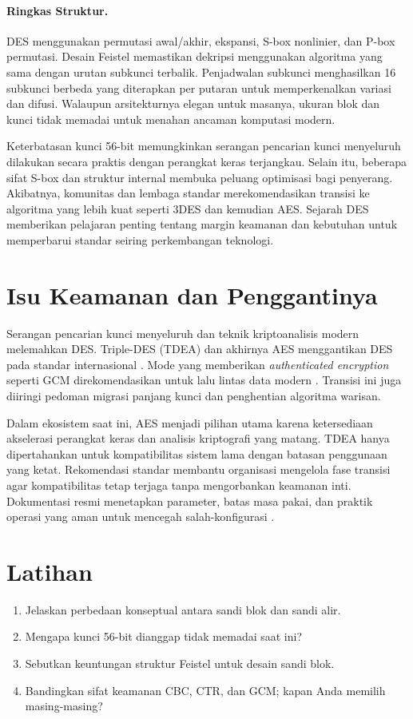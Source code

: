 \documentclass[../main.tex]{subfiles}
\begin{document}
\paragraph{Ringkas Struktur.} DES menggunakan permutasi awal/akhir, ekspansi, S-box nonlinier, dan P-box permutasi. Desain Feistel memastikan dekripsi menggunakan algoritma yang sama dengan urutan subkunci terbalik. Penjadwalan subkunci menghasilkan 16 subkunci berbeda yang diterapkan per putaran untuk memperkenalkan variasi dan difusi. Walaupun arsitekturnya elegan untuk masanya, ukuran blok dan kunci tidak memadai untuk menahan ancaman komputasi modern.

Keterbatasan kunci 56-bit memungkinkan serangan pencarian kunci menyeluruh dilakukan secara praktis dengan perangkat keras terjangkau. Selain itu, beberapa sifat S-box dan struktur internal membuka peluang optimisasi bagi penyerang. Akibatnya, komunitas dan lembaga standar merekomendasikan transisi ke algoritma yang lebih kuat seperti 3DES dan kemudian AES. Sejarah DES memberikan pelajaran penting tentang margin keamanan dan kebutuhan untuk memperbarui standar seiring perkembangan teknologi.

\section{Isu Keamanan dan Penggantinya}
Serangan pencarian kunci menyeluruh dan teknik kriptoanalisis modern melemahkan DES. Triple-DES (TDEA) dan akhirnya AES menggantikan DES pada standar internasional \citep{nist_des,nist_sp_800_67r2,nist_aes}. Mode yang memberikan \emph{authenticated encryption} seperti GCM direkomendasikan untuk lalu lintas data modern \citep{nist_sp_800_38d}. Transisi ini juga diiringi pedoman migrasi panjang kunci dan penghentian algoritma warisan.

Dalam ekosistem saat ini, AES menjadi pilihan utama karena ketersediaan akselerasi perangkat keras dan analisis kriptografi yang matang. TDEA hanya dipertahankan untuk kompatibilitas sistem lama dengan batasan penggunaan yang ketat. Rekomendasi standar membantu organisasi mengelola fase transisi agar kompatibilitas tetap terjaga tanpa mengorbankan keamanan inti. Dokumentasi resmi menetapkan parameter, batas masa pakai, dan praktik operasi yang aman untuk mencegah salah-konfigurasi \citep{nist_sp_800_67r2,nist_sp_800_38d}.

\section{Latihan}
\begin{enumerate}
  \item Jelaskan perbedaan konseptual antara sandi blok dan sandi alir.
  \item Mengapa kunci 56-bit dianggap tidak memadai saat ini?
  \item Sebutkan keuntungan struktur Feistel untuk desain sandi blok.
  \item Bandingkan sifat keamanan CBC, CTR, dan GCM; kapan Anda memilih masing-masing?
\end{enumerate}
\end{document}
